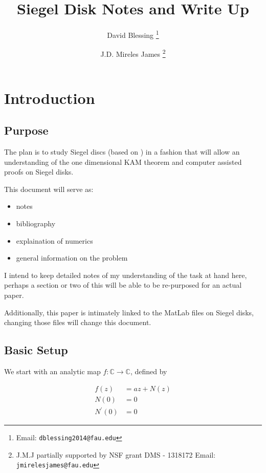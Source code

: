 \documentclass{article}
\title{Siegel Disk Notes and Write Up}
\author{David Blessing \thanks{
Email: {\tt dblessing2014@fau.edu}} }
\author{J.D. Mireles James \thanks{J.M.J partially supported by NSF grant DMS - 1318172
Email: {\tt jmirelesjames@fau.edu}}}
\affil{Florida Atlantic University, Department of Mathematical Sciences}
\newcommand{\C}{\mathbb{C}}
\theoremstyle{plain}
\theoremstyle{remark}
\begin{document}
\maketitle


\tableofcontents

\section{Introduction}%

\subsection{Purpose}
The plan is to study Siegel discs (based on \cite{kamtutorial}) in a fashion that will allow an understanding of the one dimensional KAM theorem and computer assisted proofs on Siegel disks.

\medskip

This document will serve as:

\begin{itemize}[noitemsep, topsep=0pt]
\item notes
\item bibliography
\item explaination of numerics
\item general information on the problem
\end{itemize}
I intend to keep detailed notes of my understanding of the task at hand here, perhaps a section or two of this will be able to be re-purposed for an actual paper. 

\noindent
Additionally, this paper is intimately linked to the MatLab files on Siegel disks, changing those files will change this document.

\subsection{Basic Setup}
We start with an analytic map $f : \C \to \C$, defined by 

\begin{align*}
f(z) &= az + N(z) \\
N(0) &= 0 \\
N^\prime(0) & = 0 
\end{align*}
\end{document}
